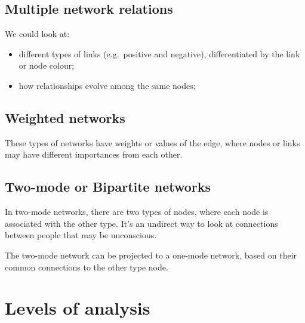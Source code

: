 \documentclass[
  notitlepage,
  onecolumn,
  openany]{book}
\providecommand{\tightlist}{%
  \setlength{\itemsep}{0pt}\setlength{\parskip}{0pt}}
\begin{document}
\hypertarget{multiple-network-relations}{%
\subsection{Multiple network relations}\label{multiple-network-relations}}

We could look at:

\begin{itemize}
\tightlist
\item
  different types of links (e.g.~positive and negative), differentiated by the link or node colour;
\item
  how relationships evolve among the same nodes;
\end{itemize}

\hypertarget{weighted-networks}{%
\subsection{Weighted networks}\label{weighted-networks}}

These types of networks have weights or values of the edge, where nodes or links may have different importances from each other.

\hypertarget{two-mode-or-bipartite-networks}{%
\subsection{Two-mode or Bipartite networks}\label{two-mode-or-bipartite-networks}}

In two-mode networks, there are two types of nodes, where each node is associated with the other type. It's an undirect way to look at connections between people that may be unconscious.

The two-mode network can be projected to a one-mode network, based on their common connections to the other type node.

\hypertarget{levels-of-analysis}{%
\section{Levels of analysis}\label{levels-of-analysis}}
\end{document}
